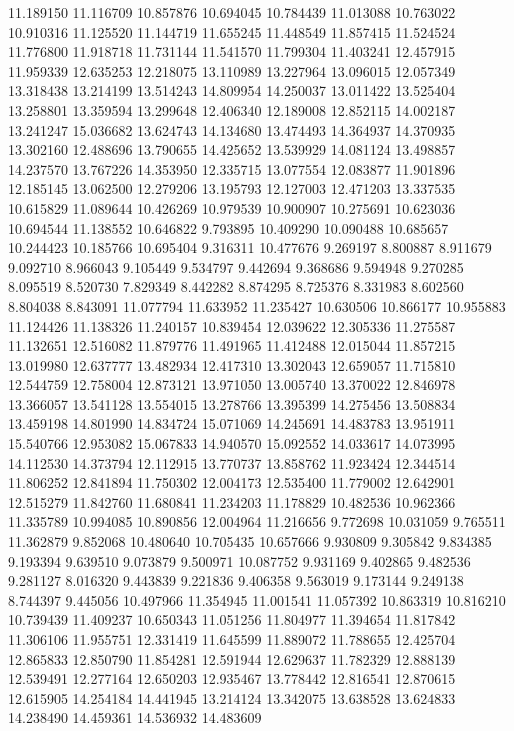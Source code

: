 11.189150
11.116709
10.857876
10.694045
10.784439
11.013088
10.763022
10.910316
11.125520
11.144719
11.655245
11.448549
11.857415
11.524524
11.776800
11.918718
11.731144
11.541570
11.799304
11.403241
12.457915
11.959339
12.635253
12.218075
13.110989
13.227964
13.096015
12.057349
13.318438
13.214199
13.514243
14.809954
14.250037
13.011422
13.525404
13.258801
13.359594
13.299648
12.406340
12.189008
12.852115
14.002187
13.241247
15.036682
13.624743
14.134680
13.474493
14.364937
14.370935
13.302160
12.488696
13.790655
14.425652
13.539929
14.081124
13.498857
14.237570
13.767226
14.353950
12.335715
13.077554
12.083877
11.901896
12.185145
13.062500
12.279206
13.195793
12.127003
12.471203
13.337535
10.615829
11.089644
10.426269
10.979539
10.900907
10.275691
10.623036
10.694544
11.138552
10.646822
9.793895
10.409290
10.090488
10.685657
10.244423
10.185766
10.695404
9.316311
10.477676
9.269197
8.800887
8.911679
9.092710
8.966043
9.105449
9.534797
9.442694
9.368686
9.594948
9.270285
8.095519
8.520730
7.829349
8.442282
8.874295
8.725376
8.331983
8.602560
8.804038
8.843091
11.077794
11.633952
11.235427
10.630506
10.866177
10.955883
11.124426
11.138326
11.240157
10.839454
12.039622
12.305336
11.275587
11.132651
12.516082
11.879776
11.491965
11.412488
12.015044
11.857215
13.019980
12.637777
13.482934
12.417310
13.302043
12.659057
11.715810
12.544759
12.758004
12.873121
13.971050
13.005740
13.370022
12.846978
13.366057
13.541128
13.554015
13.278766
13.395399
14.275456
13.508834
13.459198
14.801990
14.834724
15.071069
14.245691
14.483783
13.951911
15.540766
12.953082
15.067833
14.940570
15.092552
14.033617
14.073995
14.112530
14.373794
12.112915
13.770737
13.858762
11.923424
12.344514
11.806252
12.841894
11.750302
12.004173
12.535400
11.779002
12.642901
12.515279
11.842760
11.680841
11.234203
11.178829
10.482536
10.962366
11.335789
10.994085
10.890856
12.004964
11.216656
9.772698
10.031059
9.765511
11.362879
9.852068
10.480640
10.705435
10.657666
9.930809
9.305842
9.834385
9.193394
9.639510
9.073879
9.500971
10.087752
9.931169
9.402865
9.482536
9.281127
8.016320
9.443839
9.221836
9.406358
9.563019
9.173144
9.249138
8.744397
9.445056
10.497966
11.354945
11.001541
11.057392
10.863319
10.816210
10.739439
11.409237
10.650343
11.051256
11.804977
11.394654
11.817842
11.306106
11.955751
12.331419
11.645599
11.889072
11.788655
12.425704
12.865833
12.850790
11.854281
12.591944
12.629637
11.782329
12.888139
12.539491
12.277164
12.650203
12.935467
13.778442
12.816541
12.870615
12.615905
14.254184
14.441945
13.214124
13.342075
13.638528
13.624833
14.238490
14.459361
14.536932
14.483609
